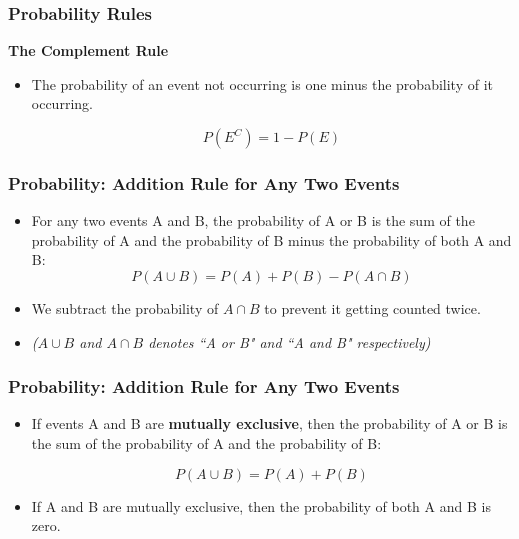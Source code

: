 \documentclass{beamer}
\begin{document}
\begin{frame}
	\frametitle{Probability Rules}
	\textbf{The Complement Rule}
	\begin{itemize}
		\item 
		The probability of an event not occurring is one minus the probability of it occurring.
		
		\[P(E^{C}) = 1 - P(E)\]
	\end{itemize}
\end{frame}
\begin{frame}
	\frametitle{Probability: Addition Rule for Any Two Events}
	\Large
	\vspace{-0.3cm}
	\begin{itemize}
		\item For any two events A and B, the probability of A or B is the sum of the probability of A and the probability of B minus the probability of both A and B:
		\[P(A \cup B) = P(A) + P(B) - P(A \cap B)\]
		\vspace{-0.2cm}
		\item We subtract the probability of $A \cap B$ to prevent it getting counted twice.
		\large
		\item \textit{($A \cup B$ and $A \cap B$ denotes  ``A or B" and ``A and B" respectively) }
		
	\end{itemize}
\end{frame}
\begin{frame}
	\frametitle{Probability: Addition Rule for Any Two Events}
	\Large
	\begin{itemize}
		\item If events A and B are \textbf{mutually exclusive}, then the probability of A or B is the sum of the probability of A and the probability of B:
		
		\[P(A \cup B) = P(A) + P(B)\]
		
		\item If A and B are mutually exclusive, then the probability of both A and B is zero.
	\end{itemize}
\end{frame}
\end{document}
